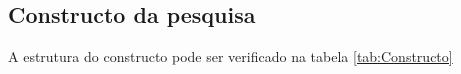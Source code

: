 \documentclass[12pt]{article}%
\begin{document}
	\subsection{Constructo da pesquisa}
	A estrutura do constructo pode ser verificado na tabela \ref{tab:Constructo}
\end{document}
